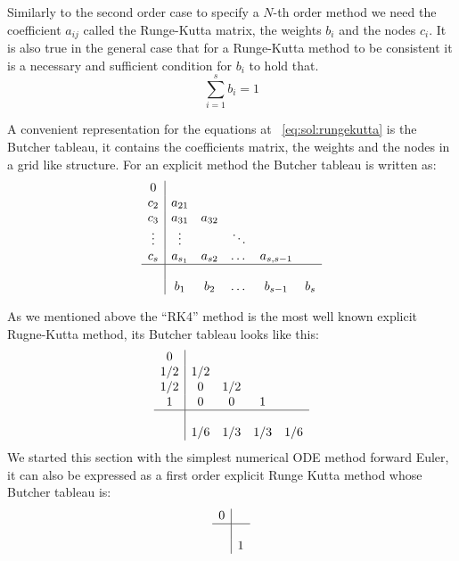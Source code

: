 \documentclass[11pt]{article}
\begin{document}
    Similarly to the second order case to specify a $N$-th order method we need the coefficient $a_{ij}$ called the
    Runge-Kutta matrix, the weights $b_i$ and the nodes $c_i$.
    It is also true in the general case that for a Runge-Kutta method to be consistent it is a necessary and sufficient
    condition for $b_i$ to hold that.
    \begin{equation*}
        \sum_{i=1}^{s} b_i = 1
    \end{equation*}

    A convenient representation for the equations at ~\eqref{eq:sol:rungekutta} is the Butcher tableau, it contains
    the coefficients matrix, the weights and the nodes in a grid like structure.
    For an explicit method the Butcher tableau is written as:
    \begin{equation*}
        \begin{array}
        {c|cccccc}
            0 \\
            c_2 & a_{21} \\
            c_3 & a_{31} & a_{32} \\
            \vdots & \vdots & & \ddots \\
            c_s & a_{s_1} & a_{s2} & \dots & a_{s,s-1} \\
            \hline \\
            & b_1 & b_2 & \dots & b_{s-1} & b_{s}
        \end{array}
    \end{equation*}

    As we mentioned above the ``RK4'' method is the most well known explicit Rugne-Kutta method, its Butcher tableau
    looks like this:
    \begin{equation*}
        \begin{array}
        {c|cccc}
            0 \\
            1/2 & 1/2 \\
            1/2 & 0 & 1/2 \\
            1 & 0 & 0 & 1 \\
            \hline \\
            & 1/6 & 1/3 & 1/3 & 1/6
        \end{array}
    \end{equation*}
    We started this section with the simplest numerical ODE method forward Euler, it can also be expressed as a first
    order explicit Runge Kutta method whose Butcher tableau is:
    \begin{equation*}
        \begin{array}
        {c|c}
            0 \\
            \hline \\
            & 1
        \end{array}
    \end{equation*}
\end{document}
